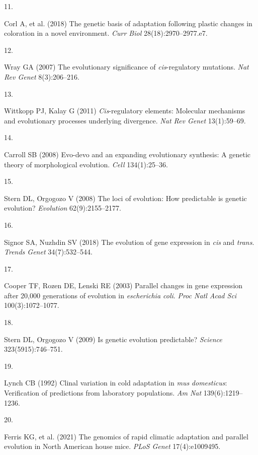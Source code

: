 \documentclass[9pt,twocolumn,twoside,lineno]{pnas-new}
\newlength{\cslhangindent}
\newlength{\csllabelwidth}
\newlength{\cslentryspacingunit} %
\newenvironment{CSLReferences}[2] %
 {%
  \setlength{\parindent}{0pt}
  \ifodd #1
  \let\oldpar\par
  \def\par{\hangindent=\cslhangindent\oldpar}
  \fi
  \setlength{\parskip}{#2\cslentryspacingunit}
 }%
 {}
\newcommand{\CSLLeftMargin}[1]{\parbox[t]{\csllabelwidth}{#1}}
\newcommand{\CSLRightInline}[1]{\parbox[t]{\linewidth - \csllabelwidth}{#1}\break}
\begin{document}
\begin{CSLReferences}{0}{0}
\leavevmode{}%
\CSLLeftMargin{11. }%
\CSLRightInline{Corl A, et al. (2018) The genetic basis of adaptation
following plastic changes in coloration in a novel environment.
\emph{Curr Biol} 28(18):2970--2977.e7.}

\leavevmode{}%
\CSLLeftMargin{12. }%
\CSLRightInline{Wray GA (2007) The evolutionary significance of
\emph{cis}-regulatory mutations. \emph{Nat Rev Genet} 8(3):206--216.}

\leavevmode{}%
\CSLLeftMargin{13. }%
\CSLRightInline{Wittkopp PJ, Kalay G (2011) \emph{Cis}-regulatory
elements: Molecular mechanisms and evolutionary processes underlying
divergence. \emph{Nat Rev Genet} 13(1):59--69.}

\leavevmode{}%
\CSLLeftMargin{14. }%
\CSLRightInline{Carroll SB (2008) Evo-devo and an expanding evolutionary
synthesis: A genetic theory of morphological evolution. \emph{Cell}
134(1):25--36.}

\leavevmode{}%
\CSLLeftMargin{15. }%
\CSLRightInline{Stern DL, Orgogozo V (2008) The loci of evolution: How
predictable is genetic evolution? \emph{Evolution} 62(9):2155--2177.}

\leavevmode{}%
\CSLLeftMargin{16. }%
\CSLRightInline{Signor SA, Nuzhdin SV (2018) The evolution of gene
expression in \emph{cis} and \emph{trans}. \emph{Trends Genet}
34(7):532--544.}

\leavevmode{}%
\CSLLeftMargin{17. }%
\CSLRightInline{Cooper TF, Rozen DE, Lenski RE (2003) Parallel changes
in gene expression after 20,000 generations of evolution in
\emph{escherichia coli}. \emph{Proc Natl Acad Sci} 100(3):1072--1077.}

\leavevmode{}%
\CSLLeftMargin{18. }%
\CSLRightInline{Stern DL, Orgogozo V (2009) Is genetic evolution
predictable? \emph{Science} 323(5915):746--751.}

\leavevmode{}%
\CSLLeftMargin{19. }%
\CSLRightInline{Lynch CB (1992) Clinal variation in cold adaptation in
\emph{mus} \emph{domesticus}: Verification of predictions from
laboratory populations. \emph{Am Nat} 139(6):1219--1236.}

\leavevmode{}%
\CSLLeftMargin{20. }%
\CSLRightInline{Ferris KG, et al. (2021) The genomics of rapid climatic
adaptation and parallel evolution in {North American} house mice.
\emph{PLoS Genet} 17(4):e1009495.}


\end{CSLReferences}
\end{document}

